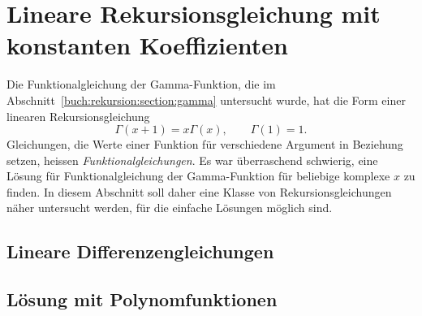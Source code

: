 %
%
%
\section{Lineare Rekursionsgleichung mit konstanten Koeffizienten
\label{buch:rekursion:section:linear}}
Die Funktionalgleichung der Gamma-Funktion, die im
Abschnitt~\ref{buch:rekursion:section:gamma} untersucht wurde,
hat die Form einer linearen Rekursionsgleichung
\[
\Gamma(x+1) = x\Gamma(x),\qquad \Gamma(1) = 1.
\]
Gleichungen, die Werte einer Funktion für verschiedene
Argument in Beziehung setzen, heissen {\em Funktionalgleichungen}.
%
Es war überraschend schwierig, eine Lösung für Funktionalgleichung
der Gamma-Funktion für beliebige komplexe $x$ zu finden.
In diesem Abschnitt soll daher eine Klasse von Rekursionsgleichungen
näher untersucht werden, für die einfache Lösungen möglich sind.

\subsection{Lineare Differenzengleichungen}

\subsection{Lösung mit Polynomfunktionen}






